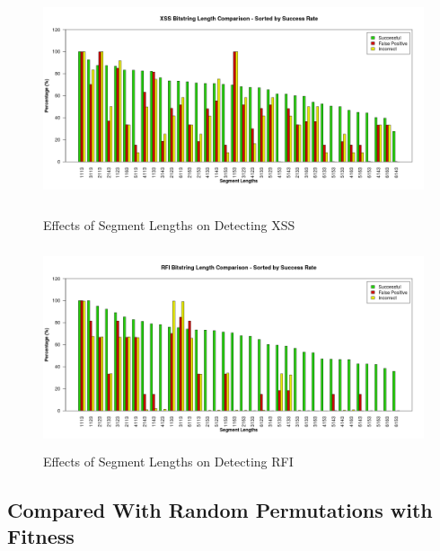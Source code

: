 \begin{appendices}
\begin{figure}[hp]
	\centering
	\includegraphics[height=225px]{./assets/appendix/fullresults/ga/bitlength/Results_SuccessRate_XSS.png}
	\caption{Effects of Segment Lengths on Detecting XSS}
	\includegraphics[height=225px]{./assets/appendix/fullresults/ga/bitlength/Results_SuccessRate_RFI.png}
	\caption{Effects of Segment Lengths on Detecting RFI}
\end{figure}

\newpage
\subsection{Compared With Random Permutations with Fitness} \label{app:resRand}


\end{appendices}
